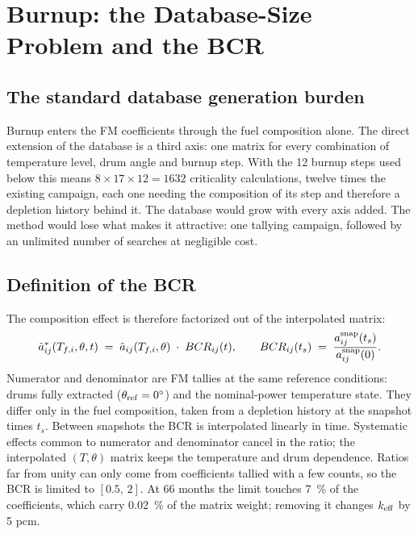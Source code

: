 \documentclass[]{ANStopical}
\begin{document}
\section{Burnup: the Database-Size Problem and the BCR}\label{sec:bcr}

\subsection{The standard database generation burden}

Burnup enters the FM coefficients through the fuel composition alone. The direct extension of the database is a third axis: one matrix for every combination of temperature level, drum angle and burnup step. With the 12 burnup steps used below this means $8\times 17\times 12 = 1632$ criticality calculations, twelve times the existing campaign, each one needing the composition of its step and therefore a depletion history behind it. The database would grow with every axis added. The method would lose what makes it attractive: one tallying campaign, followed by an unlimited number of searches at negligible cost.

\subsection{Definition of the BCR}

The composition effect is therefore factorized out of the interpolated matrix:
\begin{equation}
    \tilde a^{*}_{ij}(T_{f,i},\theta,t) \;=\; \tilde a_{ij}(T_{f,i},\theta)\;\cdot\; BCR_{ij}(t),
    \qquad
    BCR_{ij}(t_s) \;=\; \frac{a^{\rm snap}_{ij}(t_s)}{a^{\rm snap}_{ij}(0)} .
    \label{eq:bcr}
\end{equation}
Numerator and denominator are FM tallies at the same reference conditions: drums fully extracted ($\theta_{\rm ref} = \ang{0}$) and the nominal-power temperature state. They differ only in the fuel composition, taken from a depletion history at the snapshot times $t_s$. Between snapshots the BCR is interpolated linearly in time. Systematic effects common to numerator and denominator cancel in the ratio; the interpolated $(T,\theta)$ matrix keeps the temperature and drum dependence. Ratios far from unity can only come from coefficients tallied with a few counts, so the BCR is limited to $[0.5,\,2]$. At 66 months the limit touches \SI{7}{\percent} of the coefficients, which carry \SI{0.02}{\percent} of the matrix weight; removing it changes $k_{\rm eff}$ by 5 pcm.
\end{document}
